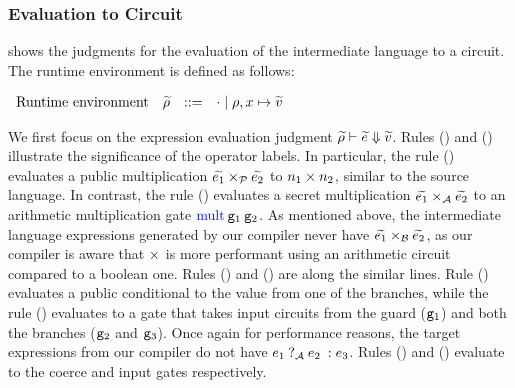 \subsubsection*{Evaluation to Circuit}  shows the judgments for the evaluation of the intermediate language to a circuit. 
The runtime environment is defined as follows:

\vspace{0.2cm}
$
\small
\begin{array}{rrcl}
    \ftext{Runtime environment} & \widetilde\rho &::=& \cdot \mid \rho,x \mapsto \val\\
\end{array}
$
\vspace{0.2cm}

We first focus on the expression evaluation judgment
$\widetilde{\rho} \vdash \widetilde{e} \Downarrow\val$. 
%
Rules ({}) and ({}) illustrate
the significance of the operator labels. In particular, the rule
({}) evaluates a public multiplication $\widetilde{e_{1}}
\mulop_{\mathcal{P}} \widetilde{e_{2}}$ to $n_{1} \mulop n_{2}$, similar to the
source language. In contrast, the rule
({}) evaluates a secret multiplication $\widetilde{e_{1}}
\mulop_{\mathcal{A}} \widetilde{e_{2}}$ to an arithmetic multiplication
gate $\kw{mult}\:\gate_{1}\:\gate_{2}$. As mentioned above, the intermediate language
expressions generated by our compiler never have $\widetilde{e_{1}}
\mulop_{\mathcal{B}} \widetilde{e_{2}}$, as our compiler is aware that $\mulop$
is more performant using an arithmetic circuit compared to a boolean
one. Rules ({}) and ({})
are along the similar lines. Rule ({}) evaluates a public
conditional to the value from one of the branches, while the rule
({}) evaluates to a  gate that takes input
circuits from the guard ($\gate_{1}$) and both the branches
($\gate_{2}$ and $\gate_{3}$). Once again for performance reasons,
the target expressions from our compiler do not have
$\lcond{\mathcal{A}}{e_{1}}{e_{2}}{e_{3}}$. Rules
({}) and ({}) evaluate to the coerce and input
gates respectively.

